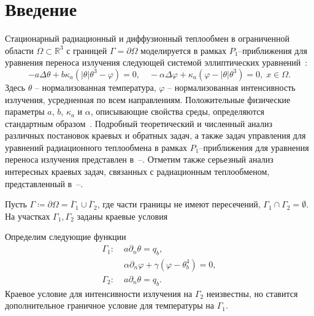\section{Введение}\label{sec:intro}
Стационарный радиационный и диффузионный теплообмен в ограниченной области
$\Omega \subset \mathbb{R}^3$ с границей $\Gamma = \partial \Omega$ моделируется в рамках  $P_1$--приближения для уравнения
переноса излучения следующей системой эллиптических уравнений~\cite{Pinnau07, AMC-13, Kovt14-1}:
\begin{equation}
    \label{eq:model}
    - a \Delta\theta + b\kappa_a(|\theta|\theta^3- \varphi)=0,   \quad
    - \alpha \Delta \varphi + \kappa_a(\varphi-|\theta|\theta^3)=0,\; x\in\Omega.
\end{equation}
Здесь $\theta$ -- нормализованная температура, $\varphi$ -- нормализованная интенсивность излучения,
усредненная по всем направлениям.
Положительные физические параметры $a$, $b$, $\kappa_a$ и $\alpha$, описывающие
свойства среды, определяются стандартным образом~\cite{Kovt14-1}.
Подробный теоретический и численный анализ различных постановок краевых и обратных задач,
а также задач управления для уравнений радиационного теплообмена
в рамках $P_1$--приближения для уравнения переноса излучения представлен в~\cite{Pinnau07}--\cite{CMMP20}.
Отметим также серьезный анализ интересных краевых задач, связанных с радиационным теплообменом,
представленный в~\cite{Amosov05}--\cite{Amosov20}.

Пусть $\Gamma \coloneqq \partial \Omega =\overline{\Gamma}_1 \cup \overline{\Gamma}_2$,
где части границы не имеют пересечений, $\Gamma_1 \cap \Gamma_2 =  \emptyset$.
На участках $\Gamma_1, \Gamma_2$ заданы краевые условия

Определим следующие функции
\begin{equation}
    \label{eq:boundary}
    \begin{aligned}
        \Gamma_1:\; &a \partial_n \theta = q_b, \\
        &\alpha\partial_n\varphi + \gamma (\varphi - \theta_b ^4 ) = 0, \\
        \Gamma_2:\; & a \partial_n \theta = q_b.
    \end{aligned}
\end{equation}
Краевое условие для интенсивности излучения на $\Gamma_2$ неизвестны, но ставится дополнительное
граничное условие для температуры на $\Gamma_1$.

